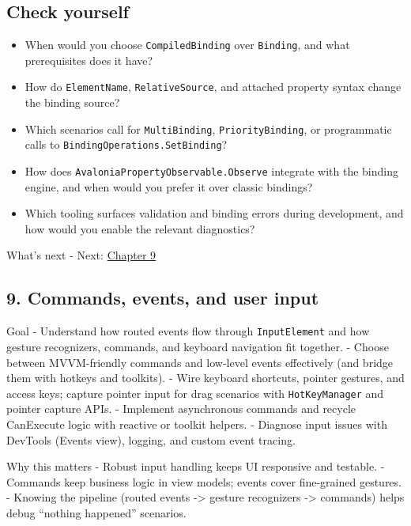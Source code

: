 \subsection{Check yourself}\label{check-yourself-6}

\begin{itemize}
\tightlist
\item
  When would you choose \passthrough{\lstinline!CompiledBinding!} over
  \passthrough{\lstinline!Binding!}, and what prerequisites does it
  have?
\item
  How do \passthrough{\lstinline!ElementName!},
  \passthrough{\lstinline!RelativeSource!}, and attached property syntax
  change the binding source?
\item
  Which scenarios call for \passthrough{\lstinline!MultiBinding!},
  \passthrough{\lstinline!PriorityBinding!}, or programmatic calls to
  \passthrough{\lstinline!BindingOperations.SetBinding!}?
\item
  How does \passthrough{\lstinline!AvaloniaPropertyObservable.Observe!}
  integrate with the binding engine, and when would you prefer it over
  classic bindings?
\item
  Which tooling surfaces validation and binding errors during
  development, and how would you enable the relevant diagnostics?
\end{itemize}

What's next - Next: \href{Chapter09.md}{Chapter 9}

\newpage

\subsection{9. Commands, events, and user
input}\label{commands-events-and-user-input}

Goal - Understand how routed events flow through
\passthrough{\lstinline!InputElement!} and how gesture recognizers,
commands, and keyboard navigation fit together. - Choose between
MVVM-friendly commands and low-level events effectively (and bridge them
with hotkeys and toolkits). - Wire keyboard shortcuts, pointer gestures,
and access keys; capture pointer input for drag scenarios with
\passthrough{\lstinline!HotKeyManager!} and pointer capture APIs. -
Implement asynchronous commands and recycle CanExecute logic with
reactive or toolkit helpers. - Diagnose input issues with DevTools
(Events view), logging, and custom event tracing.

Why this matters - Robust input handling keeps UI responsive and
testable. - Commands keep business logic in view models; events cover
fine-grained gestures. - Knowing the pipeline (routed events
-\textgreater{} gesture recognizers -\textgreater{} commands) helps
debug ``nothing happened'' scenarios.

